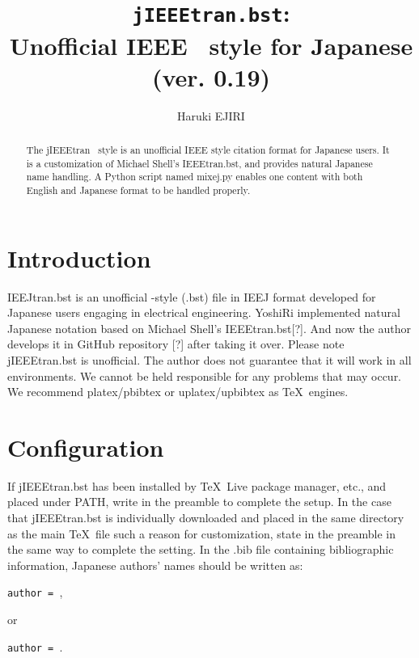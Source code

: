 \documentclass[11pt, a4paper, dvipdfmx]{article}
\title{\texttt{jIEEEtran.bst}:\\Unofficial IEEE \BibTeX\ style for Japanese\\(ver. 0.19)}
\author{Haruki EJIRI}
\begin{document}
\maketitle

\begin{abstract}
The jIEEEtran \BibTeX\ style is an unofficial IEEE style citation format for Japanese users.
It is a customization of Michael Shell's IEEEtran.bst, and provides natural Japanese name handling.
A Python script named mixej.py enables one content with both English and Japanese format to be handled properly.
\end{abstract}


\section{Introduction}

IEEJtran.bst is an unofficial \BibTeX-style (.bst) file in IEEJ format developed for Japanese users engaging in electrical engineering.
YoshiRi implemented natural Japanese notation based on Michael Shell's IEEEtran.bst[?].
And now the author develops it in GitHub repository [?] after taking it over.
Please note jIEEEtran.bst is unofficial.
The author does not guarantee that it will work in all environments.
We cannot be held responsible for any problems that may occur.
We recommend platex/pbibtex or uplatex/upbibtex as \TeX\ engines.


\section{Configuration}

If jIEEEtran.bst has been installed by \TeX\ Live package manager, etc., and placed under PATH, write \texttt{\string{}} in the preamble to complete the setup.
In the case that jIEEEtran.bst is individually downloaded and placed in the same directory as the main \TeX\ file such a reason for customization, state \texttt{\string{}} in the preamble in the same way to complete the setting.
In the .bib file containing bibliographic information, Japanese authors' names should be written as:
\begin{center}
\texttt{author = },
\end{center}
or
\begin{center}
\texttt{author = }.
\end{center}
\end{document}
